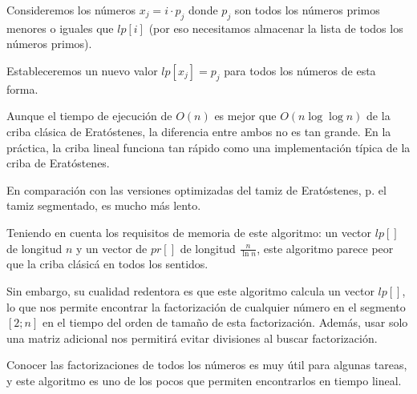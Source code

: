 Consideremos los números $x_j = i \cdot p_j$ donde $p_j$ son todos los números primos menores o iguales que $lp [i]$ (por eso necesitamos almacenar la lista de todos los números primos).

Estableceremos un nuevo valor $lp [x_j] = p_j$ para todos los números de esta forma.

Aunque el tiempo de ejecución de $O(n)$ es mejor que $O(n \log \log n)$ de la criba clásica de Eratóstenes, la diferencia entre ambos no es tan grande. En la práctica, la criba lineal funciona tan rápido como una implementación típica de la criba de Eratóstenes.

En comparación con las versiones optimizadas del tamiz de Eratóstenes, p. el tamiz segmentado, es mucho más lento.

Teniendo en cuenta los requisitos de memoria de este algoritmo: un vector $lp []$ de longitud $n$ y un vector de $pr []$ de longitud $\frac n {\ln n}$, este algoritmo parece peor que la criba clásicá en todos los sentidos.

Sin embargo, su cualidad redentora es que este algoritmo calcula un vector $lp []$, lo que nos permite encontrar la factorización de cualquier número en el segmento $[2; n]$ en el tiempo del orden de tamaño de esta factorización. Además, usar solo una matriz adicional nos permitirá evitar divisiones al buscar factorización.

Conocer las factorizaciones de todos los números es muy útil para algunas tareas, y este algoritmo es uno de los pocos que permiten encontrarlos en tiempo lineal.